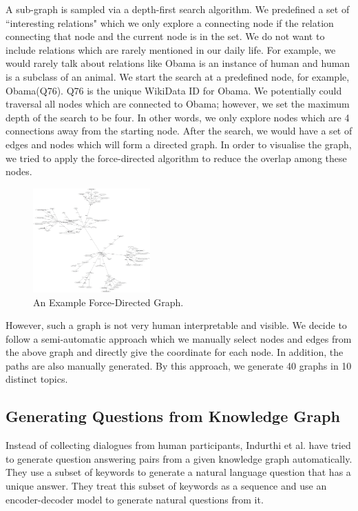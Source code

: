 \documentclass[bsc,frontabs,twoside,singlespacing,parskip,deptreport]{infthesis}     %
\begin{document}
A sub-graph is sampled via a depth-first search algorithm. We predefined a set of ``interesting relations" which we only explore a connecting node if the relation connecting that node and the current node is in the set. We do not want to include relations which are rarely mentioned in our daily life. For example, we would rarely talk about relations like Obama is an instance of human and human is a subclass of an animal. We start the search at a predefined node, for example, Obama(Q76). Q76 is the unique WikiData ID for Obama. We potentially could traversal all nodes which are connected to Obama; however, we set the maximum depth of the search to be four. In other words, we only explore nodes which are 4 connections away from the starting node. After the search, we would have a set of edges and nodes which will form a directed graph. In order to visualise the graph, we tried to apply the force-directed algorithm to reduce the overlap among these nodes.

\begin{figure}[h]
    \centering
    \includegraphics[width=0.4\textwidth]{directed.png}
    \caption{An Example Force-Directed Graph.}
    \label{fig:obama}
\end{figure}

However, such a graph is not very human interpretable and visible. We decide to follow a semi-automatic approach which we manually select nodes and edges from the above graph and directly give the coordinate for each node. In addition, the paths are also manually generated. By this approach, we generate 40 graphs in 10 distinct topics.

\subsection{Generating Questions from Knowledge Graph}

Instead of collecting dialogues from human participants, Indurthi et al. \cite{indurthi2017generating} have tried to generate question answering pairs from a given knowledge graph automatically. They use a subset of keywords to generate a natural language question that has a unique answer. They treat this subset of keywords as a sequence and use an encoder-decoder model to generate natural questions from it.
\end{document}
